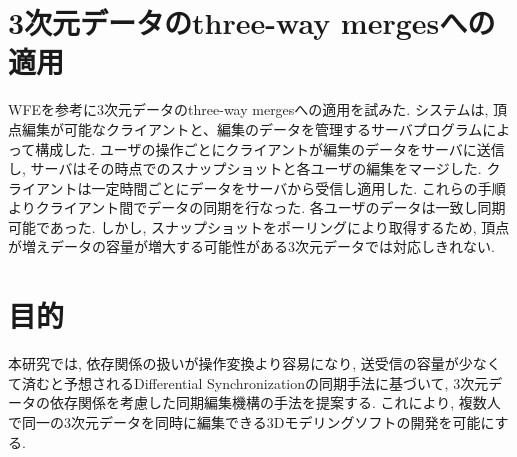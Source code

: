 \section{3次元データのthree-way mergesへの適用}
WFEを参考に3次元データのthree-way mergesへの適用を試みた.
システムは, 頂点編集が可能なクライアントと、編集のデータを管理するサーバプログラムによって構成した. ユーザの操作ごとにクライアントが編集のデータをサーバに送信し, サーバはその時点でのスナップショットと各ユーザの編集をマージした. クライアントは一定時間ごとにデータをサーバから受信し適用した. これらの手順よりクライアント間でデータの同期を行なった. 各ユーザのデータは一致し同期可能であった. しかし, スナップショットをポーリングにより取得するため, 頂点が増えデータの容量が増大する可能性がある3次元データでは対応しきれない.
\section{目的}
本研究では, 依存関係の扱いが操作変換より容易になり, 送受信の容量が少なくて済むと予想されるDifferential Synchronizationの同期手法に基づいて, 3次元データの依存関係を考慮した同期編集機構の手法を提案する.
これにより, 複数人で同一の3次元データを同時に編集できる3Dモデリングソフトの開発を可能にする.
